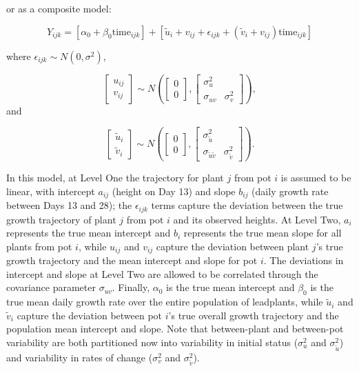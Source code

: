 \documentclass[
]{krantz}
\begin{document}
or as a composite model:

\begin{equation*}
Y_{ijk}=[\alpha_{0}+\beta_{0}\textrm{time}_{ijk}]+
[\tilde{u}_{i}+{v}_{ij}+\epsilon_{ijk}+(\tilde{v}_{i}+{v}_{ij})\textrm{time}_{ijk}]
\end{equation*}

where \(\epsilon_{ijk}\sim N(0,\sigma^2)\),

\[ \left[ \begin{array}{c}
            u_{ij} \\ v_{ij}
          \end{array}  \right] \sim N \left( \left[
          \begin{array}{c}
            0 \\ 0
          \end{array} \right], \left[
          \begin{array}{cc}
            \sigma_{u}^{2} & \\
            \sigma_{uv} & \sigma_{v}^{2}
          \end{array} \right] \right), \] and

\[ \left[ \begin{array}{c}
            \tilde{u}_{i} \\ \tilde{v}_{i}
          \end{array}  \right] \sim N \left( \left[
          \begin{array}{c}
            0 \\ 0
          \end{array} \right], \left[
          \begin{array}{cc}
            \sigma_{\tilde{u}}^{2} & \\
            \sigma_{\tilde{u}\tilde{v}} & \sigma_{\tilde{v}}^{2}
          \end{array} \right] \right). \]

In this model, at Level One the trajectory for plant \(j\) from pot \(i\) is assumed to be linear, with intercept \(a_{ij}\) (height on Day 13) and slope \(b_{ij}\) (daily growth rate between Days 13 and 28); the \(\epsilon_{ijk}\) terms capture the deviation between the true growth trajectory of plant \(j\) from pot \(i\) and its observed heights. At Level Two, \(a_{i}\) represents the true mean intercept and \(b_{i}\) represents the true mean slope for all plants from pot \(i\), while \(u_{ij}\) and \(v_{ij}\) capture the deviation between plant \(j\)'s true growth trajectory and the mean intercept and slope for pot \(i\). The deviations in intercept and slope at Level Two are allowed to be correlated through the covariance parameter \(\sigma_{uv}\). Finally, \(\alpha_{0}\) is the true mean intercept and \(\beta_{0}\) is the true mean daily growth rate over the entire population of leadplants, while \(\tilde{u}_{i}\) and \(\tilde{v}_{i}\) capture the deviation between pot \(i\)'s true overall growth trajectory and the population mean intercept and slope. Note that between-plant and between-pot variability are both partitioned now into variability in initial status (\(\sigma_{u}^{2}\) and \(\sigma_{\tilde{u}}^{2}\)) and variability in rates of change (\(\sigma_{v}^{2}\) and \(\sigma_{\tilde{v}}^{2}\)).
\end{document}
